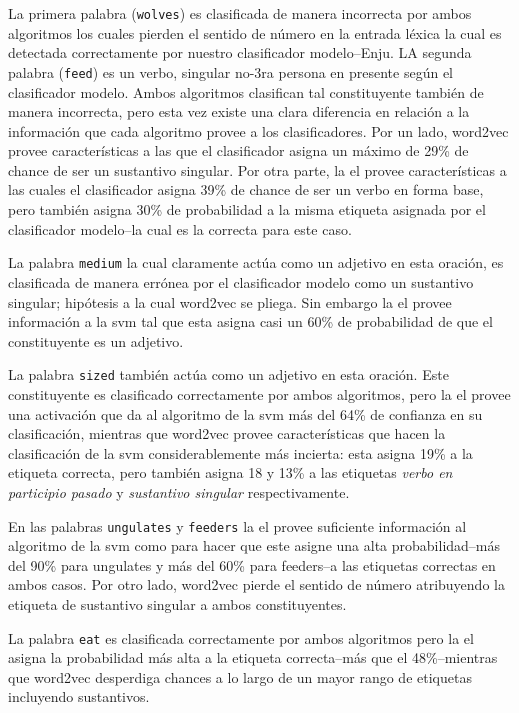 {La primera palabra (\texttt{wolves}) es clasificada de manera incorrecta por ambos algoritmos los cuales pierden el sentido de número en la entrada léxica la cual es detectada correctamente  por nuestro clasificador modelo--Enju. LA segunda palabra (\texttt{feed}) es un verbo, singular no-3ra persona en presente según el clasificador modelo. Ambos algoritmos clasifican tal constituyente también de manera incorrecta, pero esta vez existe una clara diferencia en relación a la información que cada algoritmo provee a los clasificadores. Por un lado, word2vec provee características a las que el clasificador asigna un máximo de 29\% de chance  de ser un sustantivo singular. Por otra parte, la \gls{el} provee características a las cuales el clasificador asigna 39\% de chance de ser un verbo en forma base, pero también asigna 30\% de probabilidad a la misma etiqueta asignada por el clasificador modelo--la cual es la correcta para este caso.

La palabra \texttt{medium} la cual claramente actúa como un adjetivo en esta oración, es clasificada de manera errónea por el clasificador modelo como un sustantivo singular; hipótesis a la cual word2vec se pliega. Sin embargo la \gls{el} provee información a la \gls{svm} tal que esta asigna casi un 60\% de probabilidad de que el constituyente es un adjetivo.

La palabra \texttt{sized} también actúa como un adjetivo en esta oración. Este constituyente es clasificado correctamente por ambos algoritmos, pero la \gls{el} provee una activación que da al algoritmo de la \gls{svm} más del 64\% de confianza en su clasificación, mientras que word2vec provee características que hacen la clasificación de la \gls{svm} considerablemente más incierta: esta asigna 19\% a la etiqueta correcta, pero también asigna 18 y 13\% a las etiquetas \emph{verbo en participio pasado} y \emph{sustantivo singular} respectivamente.

En las palabras \texttt{ungulates} y \texttt{feeders} la \gls{el} provee suficiente información al algoritmo de la \gls{svm} como para hacer que este asigne una alta probabilidad--más del 90\% para ungulates y más del 60\% para feeders--a las etiquetas correctas en ambos casos. Por otro lado, word2vec pierde el sentido de número atribuyendo la etiqueta de sustantivo singular a ambos constituyentes.

La palabra \texttt{eat} es clasificada correctamente por ambos algoritmos pero la \gls{el} asigna la probabilidad más alta a la etiqueta correcta--más que el 48\%--mientras que word2vec desperdiga chances a lo largo de un mayor rango de etiquetas incluyendo sustantivos.

}
